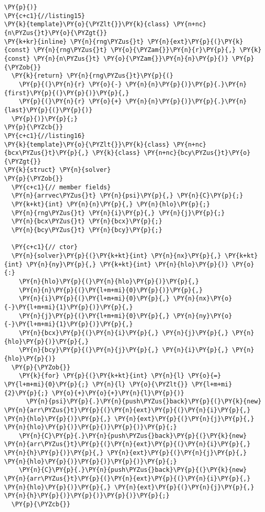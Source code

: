 \begin{Verbatim}[commandchars=\\\{\}]
\PY{p}{)} 
\PY{c+c1}{//listing15}
\PY{k}{template}\PY{o}{\PYZlt{}}\PY{k}{class} \PY{n+nc}{n\PYZus{}t}\PY{o}{\PYZgt{}}
\PY{k+kr}{inline} \PY{n}{rng\PYZus{}t} \PY{n}{ext}\PY{p}{(}\PY{k}{const} \PY{n}{rng\PYZus{}t} \PY{o}{\PYZam{}}\PY{n}{r}\PY{p}{,} \PY{k}{const} \PY{n}{n\PYZus{}t} \PY{o}{\PYZam{}}\PY{n}{n}\PY{p}{)} \PY{p}{\PYZob{}} 
  \PY{k}{return} \PY{n}{rng\PYZus{}t}\PY{p}{(}
    \PY{p}{(}\PY{n}{r} \PY{o}{-} \PY{n}{n}\PY{p}{)}\PY{p}{.}\PY{n}{first}\PY{p}{(}\PY{p}{)}\PY{p}{,} 
    \PY{p}{(}\PY{n}{r} \PY{o}{+} \PY{n}{n}\PY{p}{)}\PY{p}{.}\PY{n}{last}\PY{p}{(}\PY{p}{)}
  \PY{p}{)}\PY{p}{;} 
\PY{p}{\PYZcb{}} 
\PY{c+c1}{//listing16}
\PY{k}{template}\PY{o}{\PYZlt{}}\PY{k}{class} \PY{n+nc}{bcx\PYZus{}t}\PY{p}{,} \PY{k}{class} \PY{n+nc}{bcy\PYZus{}t}\PY{o}{\PYZgt{}}
\PY{k}{struct} \PY{n}{solver}
\PY{p}{\PYZob{}}
  \PY{c+c1}{// member fields}
  \PY{n}{arrvec\PYZus{}t} \PY{n}{psi}\PY{p}{,} \PY{n}{C}\PY{p}{;}
  \PY{k+kt}{int} \PY{n}{n}\PY{p}{,} \PY{n}{hlo}\PY{p}{;}
  \PY{n}{rng\PYZus{}t} \PY{n}{i}\PY{p}{,} \PY{n}{j}\PY{p}{;}
  \PY{n}{bcx\PYZus{}t} \PY{n}{bcx}\PY{p}{;}
  \PY{n}{bcy\PYZus{}t} \PY{n}{bcy}\PY{p}{;}

  \PY{c+c1}{// ctor}
  \PY{n}{solver}\PY{p}{(}\PY{k+kt}{int} \PY{n}{nx}\PY{p}{,} \PY{k+kt}{int} \PY{n}{ny}\PY{p}{,} \PY{k+kt}{int} \PY{n}{hlo}\PY{p}{)} \PY{o}{:}
    \PY{n}{hlo}\PY{p}{(}\PY{n}{hlo}\PY{p}{)}\PY{p}{,}
    \PY{n}{n}\PY{p}{(}\PY{l+m+mi}{0}\PY{p}{)}\PY{p}{,} 
    \PY{n}{i}\PY{p}{(}\PY{l+m+mi}{0}\PY{p}{,} \PY{n}{nx}\PY{o}{-}\PY{l+m+mi}{1}\PY{p}{)}\PY{p}{,} 
    \PY{n}{j}\PY{p}{(}\PY{l+m+mi}{0}\PY{p}{,} \PY{n}{ny}\PY{o}{-}\PY{l+m+mi}{1}\PY{p}{)}\PY{p}{,}  
    \PY{n}{bcx}\PY{p}{(}\PY{n}{i}\PY{p}{,} \PY{n}{j}\PY{p}{,} \PY{n}{hlo}\PY{p}{)}\PY{p}{,} 
    \PY{n}{bcy}\PY{p}{(}\PY{n}{j}\PY{p}{,} \PY{n}{i}\PY{p}{,} \PY{n}{hlo}\PY{p}{)}
  \PY{p}{\PYZob{}}
    \PY{k}{for} \PY{p}{(}\PY{k+kt}{int} \PY{n}{l} \PY{o}{=} \PY{l+m+mi}{0}\PY{p}{;} \PY{n}{l} \PY{o}{\PYZlt{}} \PY{l+m+mi}{2}\PY{p}{;} \PY{o}{+}\PY{o}{+}\PY{n}{l}\PY{p}{)} 
      \PY{n}{psi}\PY{p}{.}\PY{n}{push\PYZus{}back}\PY{p}{(}\PY{k}{new} \PY{n}{arr\PYZus{}t}\PY{p}{(}\PY{n}{ext}\PY{p}{(}\PY{n}{i}\PY{p}{,} \PY{n}{hlo}\PY{p}{)}\PY{p}{,} \PY{n}{ext}\PY{p}{(}\PY{n}{j}\PY{p}{,} \PY{n}{hlo}\PY{p}{)}\PY{p}{)}\PY{p}{)}\PY{p}{;}
    \PY{n}{C}\PY{p}{.}\PY{n}{push\PYZus{}back}\PY{p}{(}\PY{k}{new} \PY{n}{arr\PYZus{}t}\PY{p}{(}\PY{n}{ext}\PY{p}{(}\PY{n}{i}\PY{p}{,} \PY{n}{h}\PY{p}{)}\PY{p}{,} \PY{n}{ext}\PY{p}{(}\PY{n}{j}\PY{p}{,} \PY{n}{hlo}\PY{p}{)}\PY{p}{)}\PY{p}{)}\PY{p}{;}
    \PY{n}{C}\PY{p}{.}\PY{n}{push\PYZus{}back}\PY{p}{(}\PY{k}{new} \PY{n}{arr\PYZus{}t}\PY{p}{(}\PY{n}{ext}\PY{p}{(}\PY{n}{i}\PY{p}{,} \PY{n}{hlo}\PY{p}{)}\PY{p}{,} \PY{n}{ext}\PY{p}{(}\PY{n}{j}\PY{p}{,} \PY{n}{h}\PY{p}{)}\PY{p}{)}\PY{p}{)}\PY{p}{;}
  \PY{p}{\PYZcb{}}


\end{Verbatim}
